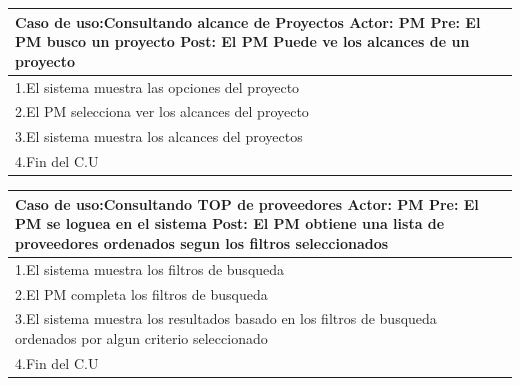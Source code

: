 \begin{longtable}{|p{}|p{}|}
    \hline
    \multicolumn{2}{|p{16cm}|}{
        \textbf{Caso de uso:}Consultando alcance de Proyectos\newline
        \textbf{Actor:} PM\newline
        \textbf{Pre: }El PM busco un proyecto\newline
        \textbf{Post:} El PM Puede ve los alcances de un proyecto
    }\\
    \hline
    1.El sistema muestra las opciones del proyecto& \\
    \hline
    2.El PM selecciona ver los alcances del proyecto&  \\
    \hline
    3.El sistema muestra los alcances del proyectos& \\
    \hline
    4.Fin del C.U&\\
    \hline
\end{longtable}

\begin{longtable}{|p{}|p{}|}
    \hline
    \multicolumn{2}{|p{16cm}|}{
        \textbf{Caso de uso:}Consultando TOP de proveedores\newline
        \textbf{Actor:} PM\newline
        \textbf{Pre: }El PM se loguea en el sistema\newline
        \textbf{Post:} El PM obtiene una lista de proveedores ordenados segun los filtros seleccionados
    }\\
    \hline
    1.El sistema muestra los filtros de busqueda& \\
    \hline
    2.El PM completa los filtros de busqueda&  \\
    \hline
    3.El sistema muestra los resultados basado en los filtros de busqueda ordenados por algun criterio seleccionado& \\
    \hline
    4.Fin del C.U&\\
    \hline
\end{longtable}


